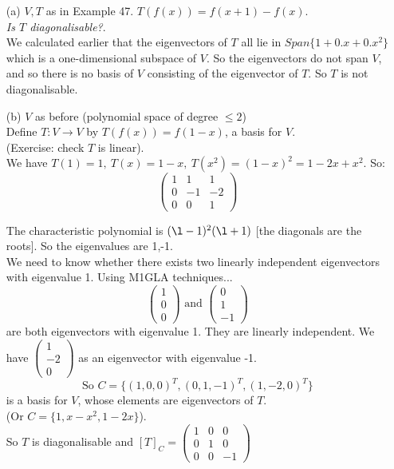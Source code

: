 \begin{examples}\begin{itemize}
\item[(a)] $V,T$ as in Example 47. $T(f(x)) = f(x+1) - f(x)$.\\
 \emph{Is $T$ diagonalisable?}.\\
 
We calculated earlier that the eigenvectors of $T$ all lie in $Span\{1 + 0.x + 0.x^2\}$ which is a one-dimensional subspace of $V$. So the eigenvectors do not span $V$, and so there is no basis of $V$ consisting of the eigenvector of $T$. So $T$ is not diagonalisable. 

\item[(b)] $V$ as before (polynomial space of degree $\leq 2$)\\
Define $T: V\to V$ by $T(f(x)) = f(1-x)$, a basis for $V$.\\ (Exercise: check $T$ is linear).\\ We have $T(1) = 1,~ T(x) = 1-x,~ T(x^2) = (1-x)^2 = 1-2x + x^2.$ So:
\[
\begin{pmatrix}
1 & 1 & 1 \\ 0 & -1 & -2 \\ 0 & 0 & 1
\end{pmatrix}
\]

The characteristic polynomial is $(\l-1)^2(\l+1)$ [the diagonals are the roots]. So the eigenvalues are 1,-1. \\

We need to know whether there exists two linearly independent eigenvectors with eigenvalue 1. Using M1GLA techniques...
\[
\left(\begin{smallmatrix}
1 \\ 0 \\0
\end{smallmatrix} \right) \text{ and } \left(\begin{smallmatrix}
0 \\ 1 \\-1
\end{smallmatrix} \right)\]
are both eigenvectors with eigenvalue 1. They are linearly independent. We have $\left(\begin{smallmatrix}
1 \\ -2 \\0
\end{smallmatrix} \right)
$ as an eigenvector with eigenvalue -1.
\[\text{So } C = \{(1,0,0)^T,(0,1,-1)^T,(1,-2,0)^T\}\] is a basis for $V$, whose elements are eigenvectors of $T.$\\ (Or $C = \{1, x-x^2,1-2x\}$). \\

So $T$ is diagonalisable and $[T]_C = \begin{pmatrix}
 1 & 0 & 0 \\ 0 & 1 & 0 \\ 0 & 0 & -1
 \end{pmatrix}$
 
 \end{itemize}
 \end{examples}
 
